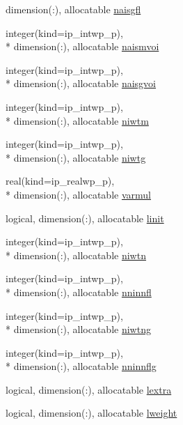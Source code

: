 \begin{DoxyCompactItemize}
dimension(\+:), allocatable \hyperlink{classmod__oasis__namcouple_ada0ad7614eba9cc3a1e168484a520c33}{naisgfl}
\item 
integer(kind=ip\+\_\+intwp\+\_\+p), \\*
dimension(\+:), allocatable \hyperlink{classmod__oasis__namcouple_ae3d7c72b2f2f3ece9583cc0b25edbaba}{naismvoi}
\item 
integer(kind=ip\+\_\+intwp\+\_\+p), \\*
dimension(\+:), allocatable \hyperlink{classmod__oasis__namcouple_a87c0bb7c0a2cccbb673dcaf35e3dec50}{naisgvoi}
\item 
integer(kind=ip\+\_\+intwp\+\_\+p), \\*
dimension(\+:), allocatable \hyperlink{classmod__oasis__namcouple_a90e4ce86f77bf89c71a9277ff9b5dcbb}{niwtm}
\item 
integer(kind=ip\+\_\+intwp\+\_\+p), \\*
dimension(\+:), allocatable \hyperlink{classmod__oasis__namcouple_a28e887d61cc4b10c00c33a7d0f51a275}{niwtg}
\item 
real(kind=ip\+\_\+realwp\+\_\+p), \\*
dimension(\+:), allocatable \hyperlink{classmod__oasis__namcouple_ab7c38fd6bd90bb8e6ebfb539ead1f1a9}{varmul}
\item 
logical, dimension(\+:), allocatable \hyperlink{classmod__oasis__namcouple_ac124af3aecadc7ba436f2ee6caffee9a}{linit}
\item 
integer(kind=ip\+\_\+intwp\+\_\+p), \\*
dimension(\+:), allocatable \hyperlink{classmod__oasis__namcouple_a63c2f2977f9cc4839f6bdec7bbbc5fa7}{niwtn}
\item 
integer(kind=ip\+\_\+intwp\+\_\+p), \\*
dimension(\+:), allocatable \hyperlink{classmod__oasis__namcouple_a579387e570e26f2d6c6c2159824cf8a3}{nninnfl}
\item 
integer(kind=ip\+\_\+intwp\+\_\+p), \\*
dimension(\+:), allocatable \hyperlink{classmod__oasis__namcouple_a3379333e7d0f24b776c81b1087f3a3b4}{niwtng}
\item 
integer(kind=ip\+\_\+intwp\+\_\+p), \\*
dimension(\+:), allocatable \hyperlink{classmod__oasis__namcouple_a6526a92cd5fa662f9da229806d062dc2}{nninnflg}
\item 
logical, dimension(\+:), allocatable \hyperlink{classmod__oasis__namcouple_a2febd0d97dea9ecc3ce4a8c5088a8d1f}{lextra}
\item 
logical, dimension(\+:), allocatable \hyperlink{classmod__oasis__namcouple_a8d88d0c1b22ea43a9429f9e3a653a64b}{lweight}
\end{DoxyCompactItemize}


